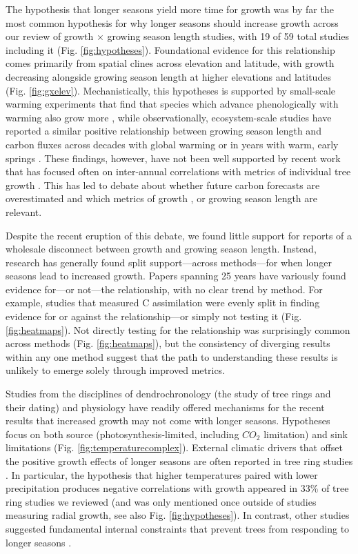 \documentclass[11pt]{article}
\begin{document}
The hypothesis that longer seasons yield more time for growth was by far the most common hypothesis for why longer seasons should increase growth across our review of growth $\times$ growing season length studies, with 19 of 59 total studies including it (Fig. \ref{fig:hypotheses}). Foundational evidence for this relationship comes primarily from spatial clines across elevation and latitude, with growth decreasing alongside growing season length at higher elevations and latitudes (Fig. \ref{fig:gxelev}). Mechanistically, this hypotheses is supported by small-scale warming experiments that find that species which advance phenologically with warming also grow more \citep[][]{Cleland:2012}, while observationally, ecosystem-scale studies have reported a similar positive relationship between growing season length and carbon fluxes across decades with global warming \citep{keenan2014net} or in years with warm, early springs \citep{chen1999effects}. These findings, however, have not been well supported by recent work that has focused often on inter-annual correlations with metrics of individual tree growth \citep{dow2022warm,silvestro2023longer}. This has led to debate about whether future carbon forecasts are overestimated and which metrics of growth \citep{green2022limits}, or growing season length \citep{korner2023four} are relevant.

Despite the recent eruption of this debate, we found little support for reports of a wholesale disconnect between growth and growing season length. Instead, research has generally found split support---across methods---for when longer seasons lead to increased growth. Papers spanning 25 years have variously found evidence for---or not---the relationship, with no clear trend by method. For example, studies that measured C assimilation were evenly split in finding evidence for or against the relationship---or simply not testing it (Fig. \ref{fig:heatmaps}). Not directly testing for the relationship was surprisingly common across methods (Fig. \ref{fig:heatmaps}), but the consistency of diverging results within any one method suggest that the path to understanding these results is unlikely to emerge solely through improved metrics. 

Studies from the disciplines of dendrochronology (the study of tree rings and their dating) and physiology have readily offered mechanisms for the recent results that increased growth may not come with longer seasons. Hypotheses focus on both source (photosynthesis-limited, including $CO_2$ limitation) and sink limitations (Fig. \ref{fig:temperaturecomplex}). External climatic drivers that offset the positive growth effects of longer seasons are often reported in tree ring studies \citep{kolavr2016response,de2022temperature,camarero2022decoupled}. In particular, the hypothesis that higher temperatures paired with lower precipitation produces negative correlations with growth appeared in 33\% of tree ring studies we reviewed (and was only mentioned once outside of studies measuring radial growth, see also Fig. \ref{fig:hypotheses}). In contrast, other studies suggested fundamental internal constraints that prevent trees from responding to longer seasons \citep[][]{cuny2012life,michelot2012comparing,zohner2023effect}. 
\end{document}
